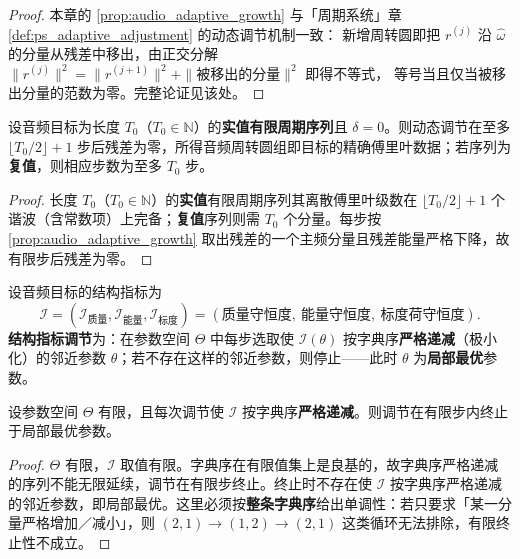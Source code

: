 \begin{proof}
本章的 \cref{prop:audio_adaptive_growth} 与「周期系统」章 \cref{def:ps_adaptive_adjustment} 的动态调节机制一致：
新增周转圆即把 $r^{(j)}$ 沿 $\hat\omega$ 的分量从残差中移出，由正交分解
$\|r^{(j)}\|^2=\|r^{(j+1)}\|^2+\|\text{被移出的分量}\|^2$ 即得不等式，
等号当且仅当被移出分量的范数为零。完整论证见该处。
\end{proof}

\begin{theorem}[动态调节的收敛性]\label{thm:audio_adaptive_convergence}
设音频目标为长度 $T_0$（$T_0\in\mathbb N$）的\textbf{实值有限周期序列}且 $\delta=0$。则动态调节在至多 $\lfloor T_0/2\rfloor+1$ 步后残差为零，所得音频周转圆组即目标的精确傅里叶数据；若序列为\textbf{复值}，则相应步数为至多 $T_0$ 步。
\end{theorem}

\begin{proof}
长度 $T_0$（$T_0\in\mathbb N$）的\textbf{实值}有限周期序列其离散傅里叶级数在 $\lfloor T_0/2\rfloor+1$ 个谐波（含常数项）上完备；\textbf{复值}序列则需 $T_0$ 个分量。每步按 \cref{prop:audio_adaptive_growth} 取出残差的一个主频分量且残差能量严格下降，故有限步后残差为零。
\end{proof}

\begin{definition}[结构指标调节]\label{def:audio_structure_metric_adjustment}
设音频目标的结构指标为
\[
\mathcal I=(\mathcal I_{\text{质量}},\mathcal I_{\text{能量}},\mathcal I_{\text{标度}})
=(\text{质量守恒度},\ \text{能量守恒度},\ \text{标度荷守恒度}).
\]
\textbf{结构指标调节}为：在参数空间 $\Theta$ 中每步选取使 $\mathcal I(\theta)$ 按字典序\textbf{严格递减}（极小化）的邻近参数 $\theta$；若不存在这样的邻近参数，则停止——此时 $\theta$ 为\textbf{局部最优}参数。
\end{definition}

\begin{proposition}[结构指标调节的有限收敛]\label{prop:audio_structure_metric_convergence}
设参数空间 $\Theta$ 有限，且每次调节使 $\mathcal I$ 按字典序\textbf{严格递减}。则调节在有限步内终止于局部最优参数。
\end{proposition}

\begin{proof}
$\Theta$ 有限，$\mathcal I$ 取值有限。字典序在有限值集上是良基的，故字典序严格递减的序列不能无限延续，调节在有限步终止。终止时不存在使 $\mathcal I$ 按字典序严格递减的邻近参数，即局部最优。这里必须按\textbf{整条字典序}给出单调性：若只要求「某一分量严格增加／减小」，则 $(2,1)\to(1,2)\to(2,1)$ 这类循环无法排除，有限终止性不成立。
\end{proof}

